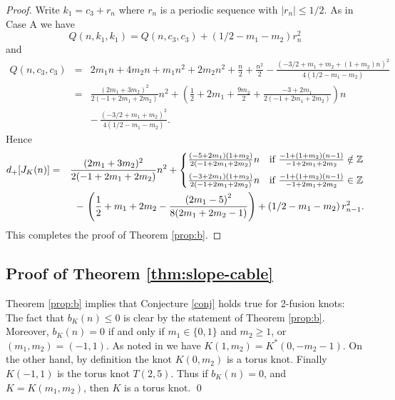 \documentclass[11pt]{amsart}
\theoremstyle{definition}
\def\BZ{\mathbb Z}
\begin{document}
\begin{proof}
Write $k_1 = c_3 + r_n$ where $r_n$ is a periodic sequence with $|r_n| \le 1/2$. As in Case A we have 
$$Q(n,k_1,k_1) = Q(n,c_3,c_3) + \left( 1/2-m_1-m_2 \right) r_n^2$$
and
\begin{eqnarray*}
Q(n,c_3,c_3) &=&  2 m_1 n + 4 m_2 n  + m_1 n^2 + 2 m_2 n^2 + \frac{n}{2} + \frac{n^2}{2} - \frac{\left( -3/2 + m_1 + m_2 + (1+m_2 ) n \right)^2}{4(1/2-m_1-m_2)} \\
&=& \frac {(2 m_1 + 3 m_2)^2} {2 (-1 + 2 m_1 + 2 m_2)} n^2 + \left( \frac{1}{2} + 2 m_1 + \frac{9m_2}{2} + \frac {-3 + 2 m_1} {2 (-1 + 2 m_1 + 2 m_2)} \right) n\\
&& - \, \frac{\left( -3/2 + m_1 + m_2  \right)^2}{4(1/2-m_1-m_2)} .
\end{eqnarray*} 
Hence 
\begin{eqnarray*}
d_+[J_K(n)] &=& \frac {(2 m_1 + 3 m_2)^2} {2 (-1 + 2 m_1 + 2 m_2)} n^2 + 
\begin{cases} \frac {(-5 + 2m_1)(1 + m_2)} {2 (-1 + 2 m_1 + 2 m_2)} n &\mbox{if } \frac {-1+(1 + m_2)(n-1)} {-1 + 2 m_1 + 2 m_2}  \notin \BZ \medskip \\ 
\frac {(-3 + 2 m_1)(1 + m_2)} {2(-1 + 2 m_1 + 2 m_2)}n & \mbox{if } \frac {-1+(1 + m_2)(n-1)} {-1 + 2 m_1 + 2 m_2}  \in  \BZ \end{cases} \\
&& - \, \left( \frac{1}{2} + m_1 + 2m_2 - \frac{\left( 2m_1 -5  \right)^2}{8(2m_1 + 2m_2 -1)} \right) + \left( 1/2-m_1-m_2 \right) r_{n-1}^2.
\end{eqnarray*}
This completes the proof of Theorem \ref{prop:b}.
\end{proof}

\subsection{Proof of Theorem \ref{thm:slope-cable}} 
Theorem \ref{prop:b} implies that Conjecture \ref{conj} holds true for 2-fusion knots: The fact that $b_K(n)\leq 0$ is clear by the statement
of Theorem \ref{prop:b}.  
Moreover, $b_K(n) = 0$ if and only if $m_1 \in \{0,1\}$ and $m_2 \ge 1$, or $(m_1, m_2) = (-1,1)$.
As noted in \cite{GV}  we have
$K(1, m_2)= K^*(0, -m_2-1)$. On the other hand, by definition 
the knot $K(0, m_2)$ is a torus  knot. Finally  $K(-1, 1)$ is the torus knot $T(2,5)$.
Thus if $b_K(n)=0$, and $K=K(m_1, m_2)$, then $K$ is a torus knot. \qed

\smallskip
\end{document}
